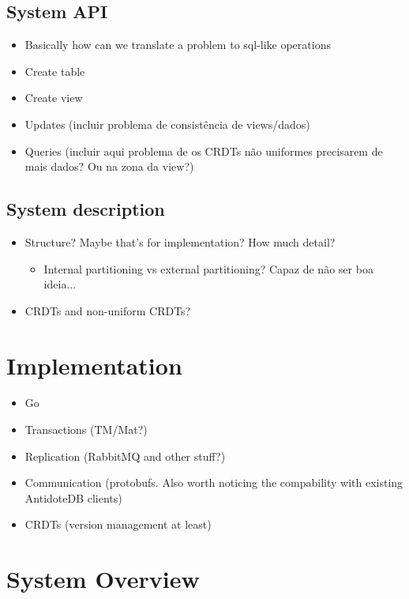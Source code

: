 \documentclass{vldb}
\begin{document}
\subsection{System API}

\begin{itemize}
	\item Basically how can we translate a problem to sql-like operations
	\item Create table
	\item Create view
	\item Updates (incluir problema de consistência de views/dados)
	\item Queries (incluir aqui problema de os CRDTs não uniformes precisarem de mais dados? Ou na zona da view?)
\end{itemize}

\subsection{System description}

\begin{itemize}
\item Structure? Maybe that's for implementation? How much detail?
\begin{itemize}
	\item Internal partitioning vs external partitioning? Capaz de não ser boa ideia...	
\end{itemize}
\item CRDTs and non-uniform CRDTs?
\end{itemize}

\section{Implementation}

\begin{itemize}
	\item Go
	\item Transactions (TM/Mat?)
	\item Replication (RabbitMQ and other stuff?)
	\item Communication (protobufs. Also worth noticing the compability with existing AntidoteDB clients)
	\item CRDTs (version management at least)
\end{itemize}

\null\newpage

\section{System Overview}
\end{document}
